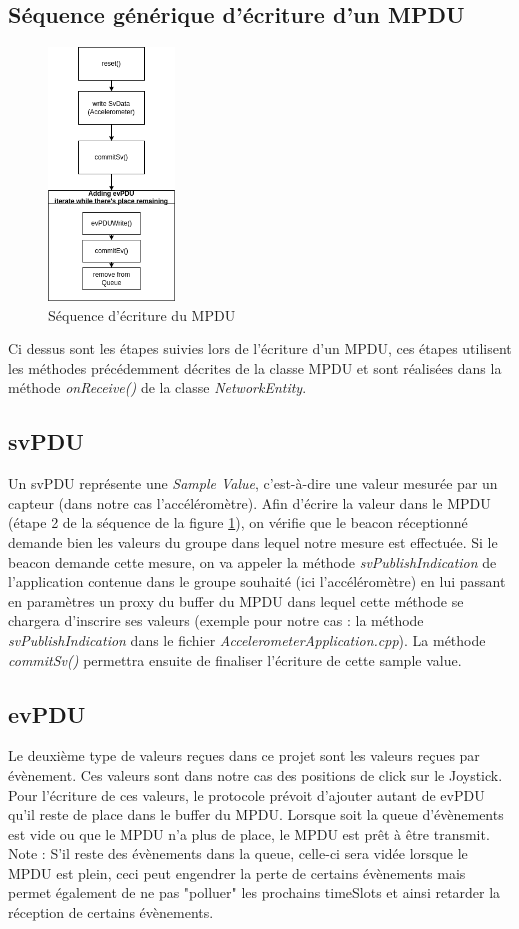 \documentclass{report}
\begin{document}
\subsection{Séquence générique d'écriture d'un MPDU}
\begin{figure}[H]
    \centering
    \includegraphics[width= 0.3\textwidth]{Images/MPDUWrite.png}
    \caption{Séquence d'écriture du MPDU}
    \label{fig:MPDUSequence}
\end{figure}
Ci dessus sont les étapes suivies lors de l'écriture d'un MPDU, ces étapes utilisent les méthodes précédemment décrites de la classe MPDU et sont réalisées dans la méthode \textit{onReceive()} de la classe \textit{NetworkEntity}. 

\subsection{svPDU}
Un svPDU représente une \textit{Sample Value}, c'est-à-dire une valeur mesurée par un capteur (dans notre cas l'accéléromètre). Afin d'écrire la valeur dans le MPDU (étape 2 de la séquence de la figure \ref{fig:MPDUSequence}), on vérifie que le beacon réceptionné demande bien les valeurs du groupe dans lequel notre mesure est effectuée. Si le beacon demande cette mesure, on va appeler la méthode \textit{svPublishIndication} de l'application contenue dans le groupe souhaité (ici l'accéléromètre) en lui passant en paramètres un proxy du buffer du MPDU dans lequel cette méthode se chargera d'inscrire ses valeurs (exemple pour notre cas : la méthode \textit{svPublishIndication} dans le fichier \textit{AccelerometerApplication.cpp}). La méthode \textit{commitSv()} permettra ensuite de finaliser l'écriture de cette sample value.
\subsection{evPDU}
Le deuxième type de valeurs reçues dans ce projet sont les valeurs reçues par évènement. Ces valeurs sont dans notre cas des positions de click sur le Joystick. Pour l'écriture de ces valeurs, le protocole prévoit d'ajouter autant de evPDU qu'il reste de place dans le buffer du MPDU. Lorsque soit la queue d'évènements est vide ou que le MPDU n'a plus de place, le MPDU est prêt à être transmit. Note : S'il reste des évènements dans la queue, celle-ci sera vidée lorsque le MPDU est plein, ceci peut engendrer la perte de certains évènements mais permet également de ne pas "polluer" les prochains timeSlots et ainsi retarder la réception de certains évènements.
\end{document}

